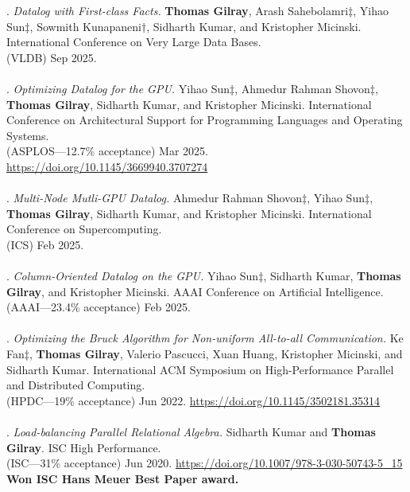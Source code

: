 \paper. \textit{Datalog with First-class Facts.}
\textbf{Thomas Gilray}, Arash Sahebolamri$\ddagger$, Yihao Sun$\ddagger$, Sowmith Kunapaneni$\dagger$, Sidharth Kumar, and Kristopher Micinski.
International Conference on Very Large Data Bases.
\\(VLDB) Sep 2025.
\\ \vspace{-0.1cm}\\
\paper. \textit{Optimizing Datalog for the GPU.}
Yihao Sun$\ddagger$, Ahmedur Rahman Shovon$\ddagger$, \textbf{Thomas Gilray}, Sidharth Kumar, and Kristopher Micinski.
International Conference on Architectural Support for Programming Languages and Operating Systems.
\\(ASPLOS---12.7\% acceptance) Mar 2025. \url{https://doi.org/10.1145/3669940.3707274}
\\ \vspace{-0.1cm}\\
\paper. \textit{Multi-Node Mutli-GPU Datalog.}
Ahmedur Rahman Shovon$\ddagger$, Yihao Sun$\ddagger$, \textbf{Thomas Gilray}, Sidharth Kumar, and Kristopher Micinski.
International Conference on Supercomputing.
\\(ICS) Feb 2025.
\\ \vspace{-0.1cm}\\
\paper. \textit{Column-Oriented Datalog on the GPU.}
Yihao Sun$\ddagger$, Sidharth Kumar, \textbf{Thomas Gilray}, and Kristopher Micinski.
AAAI Conference on Artificial Intelligence.
\\(AAAI---23.4\% acceptance) Feb 2025.
\\ \vspace{-0.1cm}\\
\paper. \textit{Optimizing the Bruck Algorithm for Non-uniform All-to-all Communication.}
Ke Fan$\ddagger$, \textbf{Thomas Gilray}, Valerio Pascucci, Xuan Huang, Kristopher Micinski, and Sidharth Kumar.
International ACM Symposium on High-Performance Parallel and Distributed Computing.
\\(HPDC---19\% acceptance) Jun 2022. \url{https://doi.org/10.1145/3502181.35314}
\\ \vspace{-0.1cm}\\
\paper. \textit{Load-balancing Parallel Relational Algebra.}
Sidharth Kumar and \textbf{Thomas Gilray}.
ISC High Performance.
\\(ISC---31\% acceptance) Jun 2020. \url{https://doi.org/10.1007/978-3-030-50743-5_15}
\\\textbf{Won ISC Hans Meuer Best Paper award.} \\ \vspace{-0.1cm}\\
